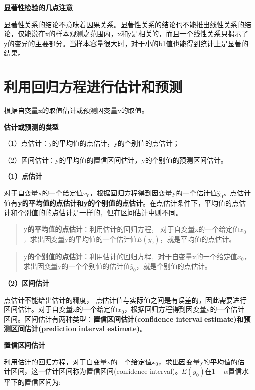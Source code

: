 \documentclass[]{ctexbook}
\begin{document}
\textbf{显著性检验的几点注意}

显著性关系的结论不意味着因果关系。显著性关系的结论也不能推出线性关系的结论，仅能说在x的样本观测之范围内，x和y是相关的，而且一个线性关系只揭示了y的变异的主要部分。当样本容量很大时，对于小的b1值也能得到统计上是显著的结果。

\hypertarget{ux5229ux7528ux56deux5f52ux65b9ux7a0bux8fdbux884cux4f30ux8ba1ux548cux9884ux6d4b}{%
\section{利用回归方程进行估计和预测}\label{ux5229ux7528ux56deux5f52ux65b9ux7a0bux8fdbux884cux4f30ux8ba1ux548cux9884ux6d4b}}

根据自变量x的取值估计或预测因变量y的取值。

\textbf{估计或预测的类型}

（1）点估计：y的平均值的点估计，y的个别值的点估计；

（2）区间估计：y的平均值的置信区间估计，y的个别值的预测区间估计。

\textbf{（1）点估计}

对于自变量x的一个给定值\(x_0\)，根据回归方程得到因变量y的一个估计值\(\hat y_0\)。点估计值有\textbf{y的平均值的点估计}和\textbf{y的个别值的点估计}。在点估计条件下，平均值的点估计和个别值的的点估计是一样的，但在区间估计中则不同。

\begin{quote}
\textbf{y的平均值的点估计}：利用估计的回归方程， 对于自变量x的一个给定值\(x_0\)，求出因变量y的平均值的一个估计值\(E(y_0)\)，就是平均值的点估计。
\end{quote}

\begin{quote}
\textbf{y的个别值的点估计}：利用估计的回归方程，对于自变量x的一个给定值\(x_0\)，求出因变量y的一个个别值的估计值\(\hat y_0\)，就是个别值的点估计。
\end{quote}

\textbf{（2）区间估计}

点估计不能给出估计的精度， 点估计值与实际值之间是有误差的，因此需要进行区间估计。对于自变量x的一个给定值\(x_0\)，根据回归方程得到因变量y的一个估计区间。区间估计有两种类型：\textbf{置信区间估计(confidence interval estimate)}和\textbf{预测区间估计(prediction interval estimate)}。

\textbf{置信区间估计}

利用估计的回归方程，对于自变量x的一个给定值\(x_0\)，求出因变量y的平均值的估计区间，这一估计区间称为置信区间(confidence interval)。\(E(y_0)\)在\(1-\alpha\)置信水平下的置信区间为:
\end{document}
